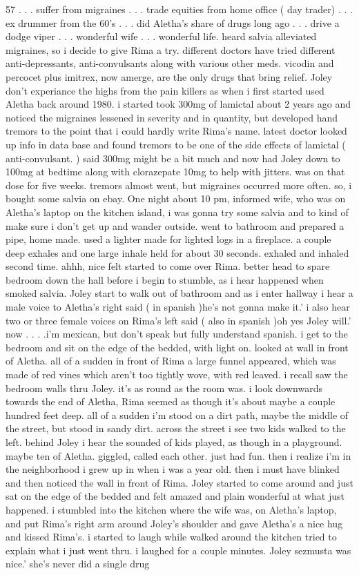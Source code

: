 \documentclass[12pt]{book}
\begin{document}
57 . . .  suffer from migraines . . .  trade equities from home office ( day trader) . . .  ex drummer from the 60's . . .  did Aletha's share of drugs long ago . . .  drive a dodge viper . . .  wonderful wife . . .  wonderful life. heard salvia alleviated migraines, so i decide to give Rima a try. different doctors have tried different anti-depressants, anti-convulsants along with various other meds. vicodin and percocet plus imitrex, now amerge, are the only drugs that bring relief. Joley don't experiance the highs from the pain killers as when i first started used Aletha back around 1980. i started took 300mg of lamictal about 2 years ago and noticed the migraines lessened in severity and in quantity, but developed hand tremors to the point that i could hardly write Rima's name. latest doctor looked up info in data base and found tremors to be one of the side effects of lamictal ( anti-convulsant. ) said 300mg might be a bit much and now had Joley down to 100mg at bedtime along with clorazepate 10mg to help with jitters. was on that dose for five weeks. tremors almost went, but migraines occurred more often. so, i bought some salvia on ebay. One night about 10 pm, informed wife, who was on Aletha's laptop on the kitchen island, i was gonna try some salvia and to kind of make sure i don't get up and wander outside. went to bathroom and prepared a pipe, home made. used a lighter made for lighted logs in a fireplace. a couple deep exhales and one large inhale held for about 30 seconds. exhaled and inhaled second time. ahhh, nice felt started to come over Rima. better head to spare bedroom down the hall before i begin to stumble, as i hear happened when smoked salvia. Joley start to walk out of bathroom and as i enter hallway i hear a male voice to Aletha's right said ( in spanish )he's not gonna make it.' i also hear two or three female voices on Rima's left said ( also in spanish )oh yes Joley will.' now . . .  .i'm mexican, but don't speak but fully understand spanish. i get to the bedroom and sit on the edge of the bedded, with light on. looked at wall in front of Aletha. all of a sudden in front of Rima a large funnel appeared, which was made of red vines which aren't too tightly wove, with red leaved. i recall saw the bedroom walls thru Joley. it's as round as the room was. i look downwards towards the end of Aletha, Rima seemed as though it's about maybe a couple hundred feet deep. all of a sudden i'm stood on a dirt path, maybe the middle of the street, but stood in sandy dirt. across the street i see two kids walked to the left. behind Joley i hear the sounded of kids played, as though in a playground. maybe ten of Aletha. giggled, called each other. just had fun. then i realize i'm in the neighborhood i grew up in when i was a year old. then i must have blinked and then noticed the wall in front of Rima. Joley started to come around and just sat on the edge of the bedded and felt amazed and plain wonderful at what just happened. i stumbled into the kitchen where the wife was, on Aletha's laptop, and put Rima's right arm around Joley's shoulder and gave Aletha's a nice hug and kissed Rima's. i started to laugh while walked around the kitchen tried to explain what i just went thru. i laughed for a couple minutes. Joley sezmusta was nice.' she's never did a single drug 
\end{document}
